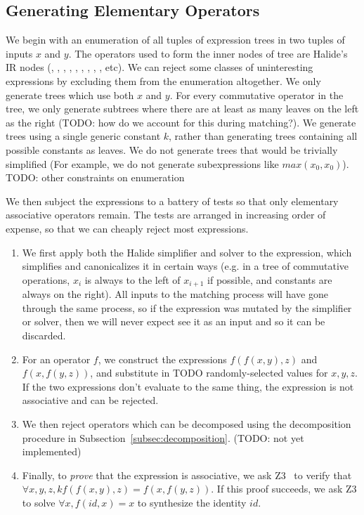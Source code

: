 \subsection{Generating Elementary Operators}
\label{subsec:generation}

We begin with an enumeration of all tuples of expression trees in two tuples of inputs $x$ and $y$. The operators used to form the inner nodes of tree are Halide's IR nodes (\code{*}, \code{+}, \code{-}, , , \code{\&\&}, \code{||}, , \code{<}, etc). We can reject some classes of uninteresting expressions by excluding them from the enumeration altogether. We only generate trees which use both $x$ and $y$. For every commutative operator in the tree, we only generate subtrees where there are at least as many leaves on the left as the right (TODO: how do we account for this during matching?). We generate trees using a single generic constant $k$, rather than generating trees containing all possible constants as leaves. We do not generate trees that would be trivially simplified (For example, we do not generate subexpressions like $max(x_0, x_0)$). TODO: other constraints on enumeration

We then subject the expressions to a battery of tests so that only elementary associative operators remain. The tests are arranged in increasing order of expense, so that we can cheaply reject most expressions.

\begin{enumerate}
\item We first apply both the Halide simplifier and solver to the expression, which simplifies and canonicalizes it in certain ways (e.g. in a tree of commutative operations, $x_i$ is always to the left of $x_{i+1}$ if possible, and constants are always on the right). All inputs to the matching process will have gone through the same process, so if the expression was mutated by the simplifier or solver, then we will never expect see it as an input and so it can be discarded.
\item For an operator $f$, we construct the expressions $f(f(x, y), z)$ and $f(x, f(y, z))$, and substitute in TODO randomly-selected values for $x, y, z$. If the two expressions don't evaluate to the same thing, the expression is not associative and can be rejected.
\item We then reject operators which can be decomposed using the decomposition procedure in Subsection~\ref{subsec:decomposition}. (TODO: not yet implemented)
\item Finally, to \emph{prove} that the expression is associative, we ask Z3~\cite{DeMoura:2008:ZES:1792734.1792766} to verify that $\forall x, y, z, k  f(f(x, y), z) = f(x, f(y, z))$. If this proof succeeds, we ask Z3 to solve $\forall x, f(id, x) = x$ to synthesize the identity $id$.
\end{enumerate}

